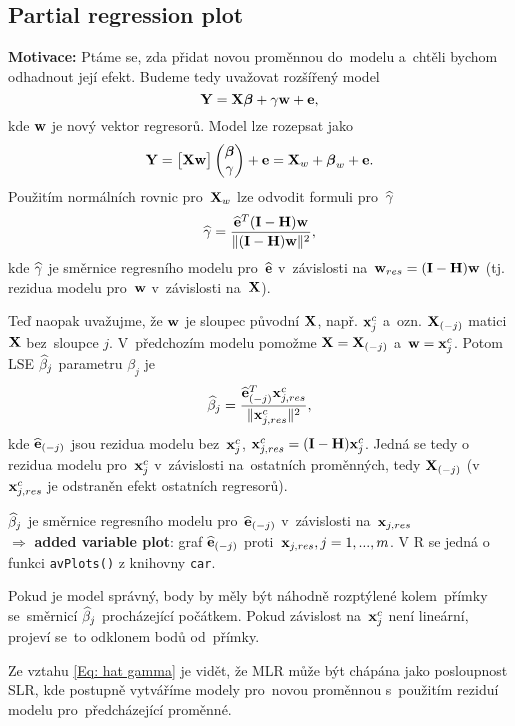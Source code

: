 \subsection{Partial regression plot}
	\textbf{Motivace:} Ptáme se, zda přidat novou proměnnou do~modelu a~chtěli bychom odhadnout její efekt. Budeme tedy uvažovat rozšířený model
	 $$
	\mathbf{Y} = \mathbf{X} \boldsymbol{\beta} + \gamma \mathbf{w} + \mathbf{e},
	 $$
	kde $\mathbf{w}$ je nový vektor regresorů. Model lze rozepsat jako
	 $$
	\mathbf{Y} = \begin{bmatrix}
	\mathbf{X} \mathbf{w}
	\end{bmatrix} \begin{pmatrix}
	\boldsymbol{\beta} \\ \gamma
	\end{pmatrix} + \mathbf{e} = \mathbf{X}_w + \boldsymbol{\beta}_w + \mathbf{e}.
	 $$
	Použitím normálních rovnic pro~$\mathbf{X}_w$ lze odvodit formuli pro~$\widehat{\gamma}$
	\begin{equation}
		\widehat{\gamma} = \frac{\widehat{\mathbf{e}}^T (\textbf{I} - \textbf{H}) \mathbf{w}}{\| (\textbf{I} - \textbf{H})\mathbf{w} \|^2},
		\label{Eq: hat gamma}
	\end{equation}
	kde $\widehat{\gamma}$ je směrnice regresního modelu pro~$\widehat{\mathbf{e}}$ v~závislosti na~$\mathbf{w}_{res} = (\textbf{I} - \textbf{H})\mathbf{w}$ (tj. rezidua modelu pro~$\mathbf{w}$ v~závislosti na~$\mathbf{X}$).
	
	Teď naopak uvažujme, že $\mathbf{w}$ je sloupec původní $\mathbf{X}$, např. $\mathbf{x}_j^c$ a~ozn. $\mathbf{X}_{(-j)}$ matici $\mathbf{X}$ bez~sloupce $j$. V~předchozím modelu pomožme $\mathbf{X} = \mathbf{X}_{(-j)}$ a~$\mathbf{w} = \mathbf{x}_j^c$. Potom  LSE $\widehat{\beta}_j$ parametru $\beta_j$ je
	 $$
	\widehat{\beta}_j = \frac{\widehat{\mathbf{e}}_{(-j)}^T \mathbf{x}_{j, res}^c}{\| \mathbf{x}_{j,res}^c \|^2},
	 $$
	kde $\widehat{\mathbf{e}}_{(-j)}$ jsou rezidua modelu bez~$\mathbf{x}_j^c$, $\mathbf{x}_{j,res}^c = (\textbf{I} - \textbf{H}) \mathbf{x}_j^c$. Jedná se tedy o rezidua modelu pro~$\mathbf{x}_j^c$ v~závislosti na~ostatních proměnných, tedy $\mathbf{X}_{(-j)}$ (v $\mathbf{x}_{j,res}^c$ je odstraněn efekt ostatních regresorů).
	
	 $\widehat{\beta}_j$ je směrnice regresního modelu pro~$\widehat{\mathbf{e}}_{(-j)}$ v~závislosti na~$\mathbf{x}_{j, res}$ \\ $\Rightarrow$ \textbf{added variable plot}: graf $\widehat{\mathbf{e}}_{(-j)}$ proti~$\mathbf{x}_{j, res}, j = 1,..., m$. V R se jedná o funkci \verb|avPlots()| z knihovny \verb|car|.
	
	Pokud je model správný, body by měly být náhodně rozptýlené kolem~přímky se~směrnicí $\widehat{\beta}_j$ procházející počátkem. Pokud závislost na~$\mathbf{x}_j^c$ není lineární, projeví se~to odklonem bodů od~přímky.


\begin{remark}
Ze vztahu \eqref{Eq: hat gamma} je vidět, že MLR může být chápána jako posloupnost SLR, kde postupně vytváříme modely pro~novou proměnnou s~použitím reziduí modelu pro~předcházející proměnné.
\end{remark}

